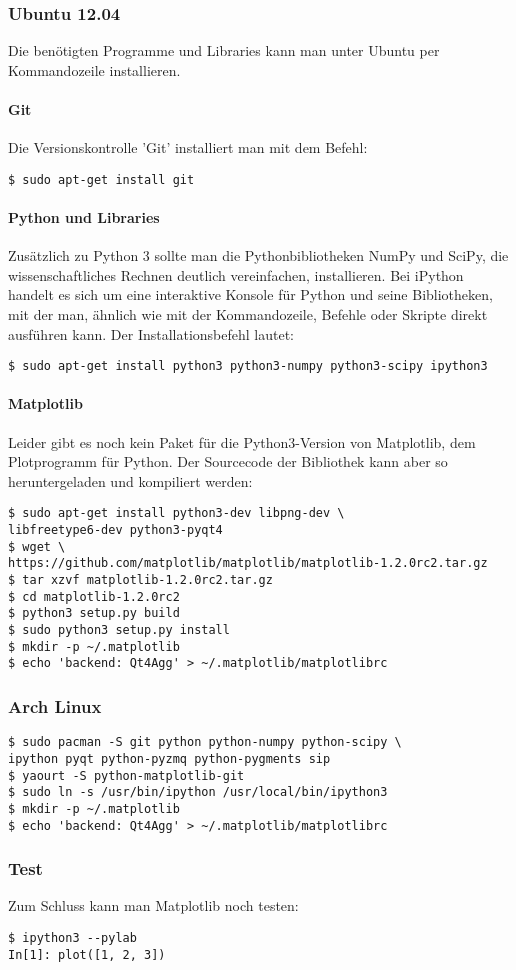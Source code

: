 \subsubsection{Ubuntu 12.04}
Die benötigten Programme und Libraries kann man unter Ubuntu per Kommandozeile installieren.

\paragraph{Git}
Die Versionskontrolle 'Git' installiert man mit dem Befehl:
\begin{verbatim}
$ sudo apt-get install git
\end{verbatim}

\paragraph{Python und Libraries}
Zusätzlich zu Python 3 sollte man die Pythonbibliotheken NumPy und SciPy, die wissenschaftliches Rechnen deutlich vereinfachen, installieren.
Bei iPython handelt es sich um eine interaktive Konsole für Python und seine Bibliotheken, mit der man, ähnlich wie mit der Kommandozeile, Befehle oder Skripte direkt ausführen kann.
Der Installationsbefehl lautet:
\begin{verbatim}
$ sudo apt-get install python3 python3-numpy python3-scipy ipython3
\end{verbatim}

\paragraph{Matplotlib}
Leider gibt es noch kein Paket für die Python3-Version von Matplotlib, dem Plotprogramm für Python.
Der Sourcecode der Bibliothek kann aber so heruntergeladen und kompiliert werden:
\begin{verbatim}
$ sudo apt-get install python3-dev libpng-dev \
libfreetype6-dev python3-pyqt4
$ wget \
https://github.com/matplotlib/matplotlib/matplotlib-1.2.0rc2.tar.gz
$ tar xzvf matplotlib-1.2.0rc2.tar.gz
$ cd matplotlib-1.2.0rc2
$ python3 setup.py build
$ sudo python3 setup.py install
$ mkdir -p ~/.matplotlib
$ echo 'backend: Qt4Agg' > ~/.matplotlib/matplotlibrc
\end{verbatim}

\subsubsection{Arch Linux}
\begin{verbatim}
$ sudo pacman -S git python python-numpy python-scipy \
ipython pyqt python-pyzmq python-pygments sip
$ yaourt -S python-matplotlib-git
$ sudo ln -s /usr/bin/ipython /usr/local/bin/ipython3
$ mkdir -p ~/.matplotlib
$ echo 'backend: Qt4Agg' > ~/.matplotlib/matplotlibrc
\end{verbatim}

\subsubsection{Test}
Zum Schluss kann man Matplotlib noch testen:
\begin{verbatim}
$ ipython3 --pylab
In[1]: plot([1, 2, 3])
\end{verbatim}
